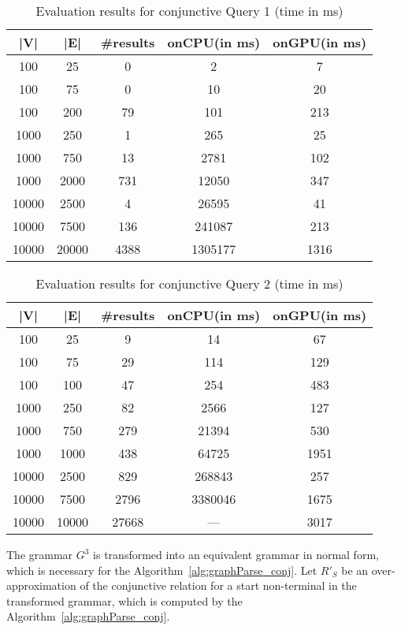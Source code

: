 \begin{table*}[ht]
	\centering
	\caption{Evaluation results for conjunctive Query 1 (time in ms)}
	\label{tbl3}
	
	\begin{tabular}{ | c | c | c | c | c |}
		\hline
		|V| & |E| & \#results & onCPU(in ms) & onGPU(in ms) \\
		\hline 
		\hline
		100 & 25 & 0 & 2 & 7\\
		100 & 75 & 0 & 10 & 20\\
		100 & 200 & 79 & 101 & 213\\
		1000  & 250 & 1 & 265 & 25\\
		1000 & 750 & 13 & 2781 & 102\\
		1000 & 2000 & 731 & 12050 & 347\\
		10000 & 2500 & 4 & 26595 & 41\\
		10000 & 7500 & 136 & 241087 & 213\\
		10000 & 20000 & 4388 & 1305177 & 1316\\
		\hline
	\end{tabular}
	
\end{table*}

\begin{table*}[h]
	\centering
	\caption{Evaluation results for conjunctive Query 2 (time in ms)}
	\label{tbl4}
	
	\begin{tabular}{ | c | c | c | c | c |}
		\hline
		|V| & |E| & \#results & onCPU(in ms) & onGPU(in ms) \\
		\hline 
		\hline
		100 & 25 & 9 & 14 & 67\\
		100 & 75 & 29 & 114 & 129\\
		100 & 100 & 47 & 254 & 483\\
		1000  & 250 & 82 & 2566 & 127\\
		1000 & 750 & 279 & 21394 & 530\\
		1000 & 1000 & 438 & 64725 & 1951\\
		10000 & 2500 & 829 & 268843 & 257\\
		10000 & 7500 & 2796 & 3380046 & 1675\\
		10000 & 10000 & 27668 & --- & 3017\\
		\hline
	\end{tabular}
	
\end{table*}


The grammar $G^3$ is transformed into an equivalent grammar in normal form, which is necessary for the Algorithm~\ref{alg:graphParse_conj}. Let $R'_S$ be an over-approximation of the conjunctive relation for a start non-terminal in the transformed grammar, which is computed by the Algorithm~\ref{alg:graphParse_conj}.

